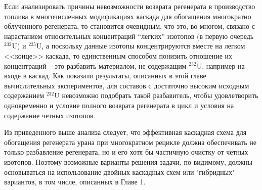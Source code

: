 Если анализировать причины невозможности возврата регенерата в производство топлива в многочисленных модификациях каскада для обогащения многократно облученного регенерата, то становится очевидным, что это, во многом, связано с нарастанием относительных концентраций “легких” изотопов (в первую очередь $^{232}$U) и
$^{235}$U, а поскольку данные изотопы концентрируются вместе на легком <<конце>> каскада, то единственным способом понизить отношение их концентраций -- это разбавить материалом, не содержащим $^{232}$U, например на входе в каскад. Как показали результаты, описанных в этой главе вычислительных экспериментов, для составов с достаточно высоким исходным содержанием $^{232}$U невозможно подобрать такой разбавитель, чтобы удовлетворить одновременно и условие полного возврата регенерата в цикл и условия на содержание четных изотопов.

Из приведенного выше анализа следует, что эффективная каскадная схема для обогащения регенерата урана при многократном рецикле должна обеспечивать не только разбавление регенерата, но и его хотя бы частичную очистку от чётных изотопов. Поэтому возможные варианты решения задачи, по-видимому, должны основываться на использование двойных каскадных схем или "гибридных" вариантов, в том числе, описанных в Главе 1. 
\clearpage
